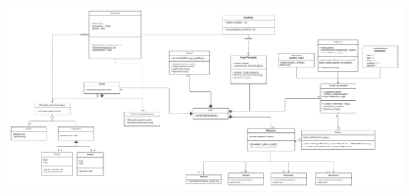 \begin{center}
    \centering
    \includegraphics[height = 13 cm, angle = 90]{images/Diagramme_V5.png}\\
\end{center}
